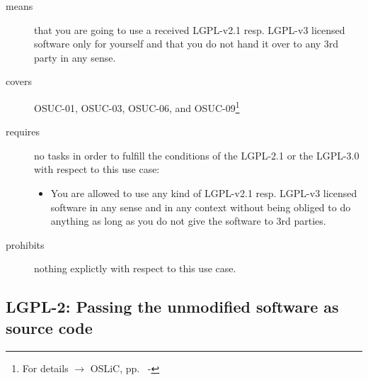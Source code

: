 \begin{description}

\item[means] that you are going to use a received LGPL-v2.1 resp. LGPL-v3
licensed software only for yourself and that you do not hand it over to any 3rd
party in any sense.

\item[covers] OSUC-01, OSUC-03, OSUC-06, and OSUC-09\footnote{For details
$\rightarrow$ OSLiC, pp.\ \pageref{OSUC-01-DEF} - \pageref{OSUC-09-DEF}}

\item[requires] no tasks in order to fulfill the conditions of the LGPL-2.1 or
the LGPL-3.0 with respect to this use case:
  \begin{itemize}
    \item You are allowed to use any kind of LGPL-v2.1 resp. LGPL-v3 licensed
    software in any sense and in any context without being obliged to do
    anything as long as you do not give the software to 3rd parties.
  \end{itemize}

\item[prohibits] nothing explictly with respect to this use case.
\end{description}


\subsection{LGPL-2: Passing the unmodified software as source code}
\label{OSUC-02S-LGPL} \label{OSUC-05S-LGPL} \label{OSUC-07S-LGPL} 

